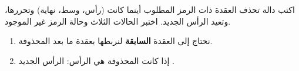 \begin{statement}
اكتب دالة  تحذف العقدة ذات الرمز المطلوب أينما كانت (رأس، وسط، نهاية) وتحررها، وتعيد الرأس الجديد. اختبر الحالات الثلاث وحالة الرمز غير الموجود.
\end{statement}
\begin{stepsbox}\begin{enumerate}
\item نحتاج إلى العقدة \textbf{السابقة}  لنربطها بعقدة ما بعد المحذوفة.
\item إذا كانت المحذوفة هي الرأس: الرأس الجديد .
\end{enumerate}\end{stepsbox}
